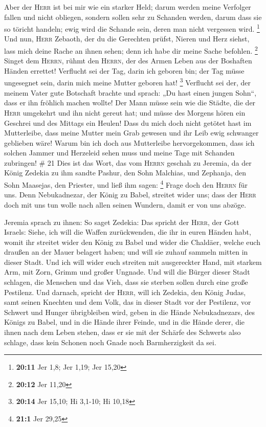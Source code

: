  Aber der \textsc{Herr} ist bei mir wie ein starker Held;
darum werden meine Verfolger fallen und nicht obliegen, sondern sollen
sehr zu Schanden werden, darum dass sie so töricht handeln; ewig wird
die Schande sein, deren man nicht vergessen wird. \footnote{\textbf{20:11}
  Jer 1,8; Jer 1,19; Jer 15,20}  Und nun, \textsc{Herr}
Zebaoth, der du die Gerechten prüfst, Nieren und Herz siehst, lass mich
deine Rache an ihnen sehen; denn ich habe dir meine Sache befohlen.
\footnote{\textbf{20:12} Jer 11,20}  Singet dem
\textsc{Herrn}, rühmt den \textsc{Herrn}, der des Armen Leben aus der
Boshaften Händen errettet!  Verflucht sei der Tag, darin
ich geboren bin; der Tag müsse ungesegnet sein, darin mich meine Mutter
geboren hat! \footnote{\textbf{20:14} Jer 15,10; Hi 3,1-10; Hi 10,18}
 Verflucht sei der, der meinem Vater gute Botschaft
brachte und sprach: „Du hast einen jungen Sohn``, dass er ihn fröhlich
machen wollte!  Der Mann müsse sein wie die Städte, die
der \textsc{Herr} umgekehrt und ihn nicht gereut hat; und müsse des
Morgens hören ein Geschrei und des Mittags ein Heulen! 
Dass du mich doch nicht getötet hast im Mutterleibe, dass meine Mutter
mein Grab gewesen und ihr Leib ewig schwanger geblieben wäre!
 Warum bin ich doch aus Mutterleibe hervorgekommen, dass
ich solchen Jammer und Herzeleid sehen muss und meine Tage mit Schanden
zubringen! \# 21  Dies ist das Wort, das vom
\textsc{Herrn} geschah zu Jeremia, da der König Zedekia zu ihm sandte
Pashur, den Sohn Malchias, und Zephanja, den Sohn Maasejas, den
Priester, und ließ ihm sagen: \footnote{\textbf{21:1} Jer 29,25}
 Frage doch den \textsc{Herrn} für uns. Denn Nebukadnezar,
der König zu Babel, streitet wider uns; dass der \textsc{Herr} doch mit
uns tun wolle nach allen seinen Wundern, damit er von uns abzöge.

 Jeremia sprach zu ihnen: So saget Zedekia: 
Das spricht der \textsc{Herr}, der Gott Israels: Siehe, ich will die
Waffen zurückwenden, die ihr in euren Händen habt, womit ihr streitet
wider den König zu Babel und wider die Chaldäer, welche euch draußen an
der Mauer belagert haben; und will sie zuhauf sammeln mitten in dieser
Stadt.  Und ich will wider euch streiten mit ausgereckter
Hand, mit starkem Arm, mit Zorn, Grimm und großer Ungnade.
 Und will die Bürger dieser Stadt schlagen, die Menschen
und das Vieh, dass sie sterben sollen durch eine große Pestilenz.
 Und darnach, spricht der \textsc{Herr}, will ich Zedekia,
den König Judas, samt seinen Knechten und dem Volk, das in dieser Stadt
vor der Pestilenz, vor Schwert und Hunger übrigbleiben wird, geben in
die Hände Nebukadnezars, des Königs zu Babel, und in die Hände ihrer
Feinde, und in die Hände derer, die ihnen nach dem Leben stehen, dass er
sie mit der Schärfe des Schwerts also schlage, dass kein Schonen noch
Gnade noch Barmherzigkeit da sei.

